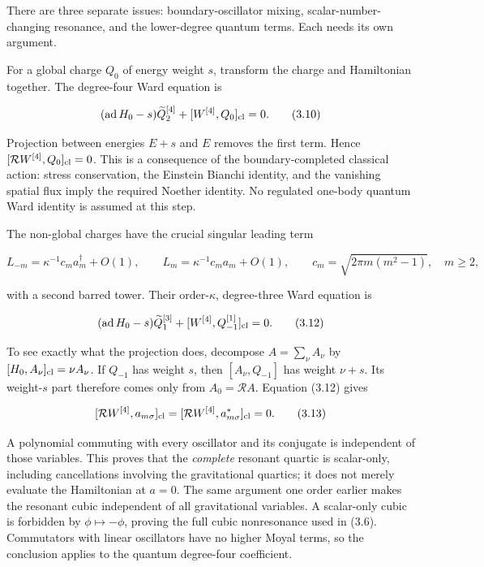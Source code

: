 There are three separate issues: boundary-oscillator mixing, scalar-number-changing resonance, and the lower-degree quantum terms. Each needs its own argument.

For a global charge \(Q_0\) of energy weight \(s\), transform the charge and Hamiltonian together. The degree-four Ward equation is

\[
(\operatorname{ad}H_0-s)\widetilde Q_2^{[4]}
+[W^{[4]},Q_0]_{\rm cl}=0 .
\tag{3.10}
\]

Projection between energies \(E+s\) and \(E\) removes the first term. Hence \([\mathcal RW^{[4]},Q_0]_{\rm cl}=0\). This is a consequence of the boundary-completed classical action: stress conservation, the Einstein Bianchi identity, and the vanishing spatial flux imply the required Noether identity. No regulated one-body quantum Ward identity is assumed at this step.

The non-global charges have the crucial singular leading term

\[
L_{-m}=\kappa^{-1}c_m a_m^\dagger+O(1),\qquad
L_m=\kappa^{-1}c_m a_m+O(1),\qquad
c_m=\sqrt{2\pi m(m^2-1)},\quad m\ge2 ,
\tag{3.11}
\]

with a second barred tower. Their order-\(\kappa\), degree-three Ward equation is

\[
(\operatorname{ad}H_0-s)\widetilde Q_1^{[3]}
+[W^{[4]},Q_{-1}^{[1]}]_{\rm cl}=0 .
\tag{3.12}
\]

To see exactly what the projection does, decompose \(A=\sum_\nu A_\nu\) by \([H_0,A_\nu]_{\rm cl}=\nu A_\nu\). If \(Q_{-1}\) has weight \(s\), then \([A_\nu,Q_{-1}]\) has weight \(\nu+s\). Its weight-\(s\) part therefore comes only from \(A_0=\mathcal RA\). Equation (3.12) gives

\[
[\mathcal RW^{[4]},a_{m\sigma}]_{\rm cl}
=[\mathcal RW^{[4]},a^*_{m\sigma}]_{\rm cl}=0 .
\tag{3.13}
\]

A polynomial commuting with every oscillator and its conjugate is independent of those variables. This proves that the \emph{complete} resonant quartic is scalar-only, including cancellations involving the gravitational quartics; it does not merely evaluate the Hamiltonian at \(a=0\). The same argument one order earlier makes the resonant cubic independent of all gravitational variables. A scalar-only cubic is forbidden by \(\phi\mapsto-\phi\), proving the full cubic nonresonance used in (3.6). Commutators with linear oscillators have no higher Moyal terms, so the conclusion applies to the quantum degree-four coefficient.


